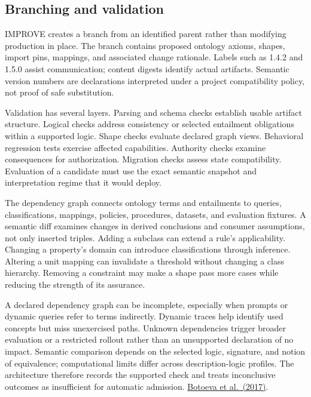 \documentclass[preprint,12pt,authoryear]{elsarticle}
\begin{document}
\subsection{Branching and validation}\label{branching-and-validation}

IMPROVE creates a branch from an identified parent rather than modifying
production in place. The branch contains proposed ontology axioms,
shapes, import pins, mappings, and associated change rationale. Labels
such as 1.4.2 and 1.5.0 assist communication; content digests identify
actual artifacts. Semantic version numbers are declarations interpreted
under a project compatibility policy, not proof of safe substitution.

Validation has several layers. Parsing and schema checks establish
usable artifact structure. Logical checks address consistency or
selected entailment obligations within a supported logic. Shape checks
evaluate declared graph views. Behavioral regression tests exercise
affected capabilities. Authority checks examine consequences for
authorization. Migration checks assess state compatibility. Evaluation
of a candidate must use the exact semantic snapshot and interpretation
regime that it would deploy.

The dependency graph connects ontology terms and entailments to queries,
classifications, mappings, policies, procedures, datasets, and
evaluation fixtures. A semantic diff examines changes in derived
conclusions and consumer assumptions, not only inserted triples. Adding
a subclass can extend a rule's applicability. Changing a property's
domain can introduce classifications through inference. Altering a unit
mapping can invalidate a threshold without changing a class hierarchy.
Removing a constraint may make a shape pass more cases while reducing
the strength of its assurance.

A declared dependency graph can be incomplete, especially when prompts
or dynamic queries refer to terms indirectly. Dynamic traces help
identify used concepts but miss unexercised paths. Unknown dependencies
trigger broader evaluation or a restricted rollout rather than an
unsupported declaration of no impact. Semantic comparison depends on the
selected logic, signature, and notion of equivalence; computational
limits differ across description-logic profiles. The architecture
therefore records the supported check and treats inconclusive outcomes
as insufficient for automatic admission.
\href{https://doi.org/10.1007/978-3-319-49493-7_2}{Botoeva et
al.~(2017)}.
\end{document}
